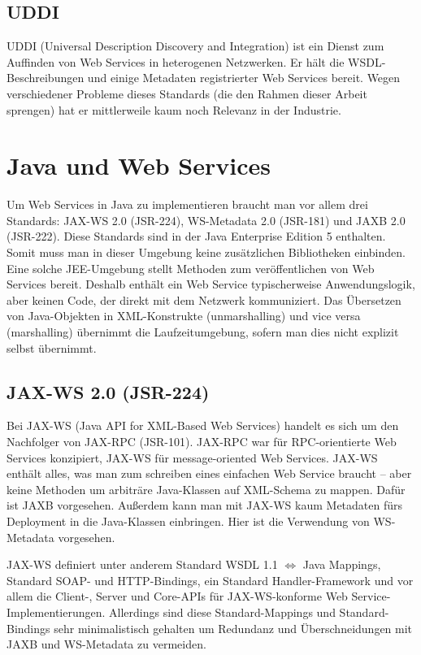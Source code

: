\documentclass[runningheads]{llncs}
\begin{document}
  \label{uddi}
  \subsection{UDDI}
    UDDI\cite{wk_uddi} (Universal Description Discovery and Integration) ist ein Dienst zum
    Auffinden von Web Services in heterogenen Netzwerken. Er hält die WSDL-Beschreibungen und
    einige Metadaten registrierter Web Services bereit. Wegen verschiedener Probleme dieses
    Standards (die den Rahmen dieser Arbeit sprengen) hat er mittlerweile kaum noch Relevanz in der
    Industrie.


  \label{wsj}
  \section{Java und Web Services}
    Um Web Services in Java zu implementieren braucht man vor allem drei Standards: JAX-WS 2.0
    (JSR-224), WS-Metadata 2.0 (JSR-181) und JAXB 2.0 (JSR-222). Diese Standards sind in der Java
    Enterprise Edition 5 enthalten. Somit muss man in dieser Umgebung keine zusätzlichen
    Bibliotheken einbinden. Eine solche JEE-Umgebung stellt Methoden zum veröffentlichen von Web
    Services bereit. Deshalb enthält ein Web Service typischerweise Anwendungslogik, aber keinen
    Code, der direkt mit dem Netzwerk kommuniziert. Das Übersetzen von Java-Objekten in
    XML-Konstrukte (unmarshalling) und vice versa
    (marshalling) übernimmt die Laufzeitumgebung, sofern man dies nicht
    explizit selbst übernimmt.


  \label{jsr224}
  \subsection{JAX-WS 2.0 (JSR-224)}
    Bei JAX-WS\cite{jsr_224} (Java API for XML-Based Web Services) handelt es sich um den
    Nachfolger von JAX-RPC (JSR-101). JAX-RPC war für RPC-orientierte Web Services konzipiert,
    JAX-WS für message-oriented Web Services. JAX-WS enthält alles, was man zum schreiben eines
    einfachen Web Service braucht -- aber keine Methoden um arbiträre Java-Klassen auf XML-Schema
    zu mappen. Dafür ist JAXB vorgesehen. Außerdem kann man mit JAX-WS kaum Metadaten fürs
    Deployment in die Java-Klassen einbringen. Hier ist die Verwendung von WS-Metadata vorgesehen.

    JAX-WS definiert unter anderem Standard WSDL 1.1 $\Leftrightarrow$ Java Mappings, Standard
    SOAP- und HTTP-Bindings, ein Standard Handler-Framework und vor allem die Client-, Server und
    Core-APIs für JAX-WS-konforme Web Service-Im\-ple\-men\-tier\-ung\-en. Allerdings sind diese
    Standard-Mappings und Standard-Bindings sehr minimalistisch gehalten um Redundanz und
    Überschneidungen mit JAXB und WS-Metadata zu vermeiden.\vfill
\end{document}
